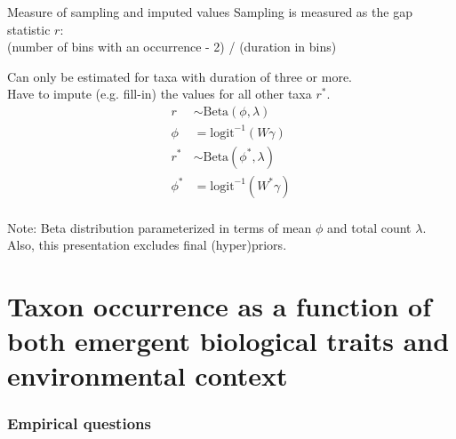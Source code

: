 \documentclass{beamer}
\begin{document}
\begin{frame}
  \begin{block}{Measure of sampling and imputed values}
    Sampling is measured as the gap statistic \(r\): \\(number of bins with an occurrence - 2) / (duration in bins)

    Can only be estimated for taxa with duration of three or more. \\Have to impute (e.g. fill-in) the values for all other taxa \(r^{\ast}\).
    \begin{align*}
      r &\sim \text{Beta}(\phi, \lambda) \\
      \phi &= \text{logit}^{-1}(W\gamma) \\
      r^{\ast} &\sim \text{Beta}(\phi^{\ast}, \lambda) \\
      \phi^{\ast} &= \text{logit}^{-1}(W^{\ast}\gamma) \\
    \end{align*}
  \end{block}

  \footnotesize{Note: Beta distribution parameterized in terms of mean \(\phi\) and total count \(\lambda\). Also, this presentation excludes final (hyper)priors.}
\end{frame}



\section{Taxon occurrence as a function of both emergent biological traits and environmental context}

\begin{frame}
  \frametitle{Empirical questions}



\end{frame}
\end{document}
